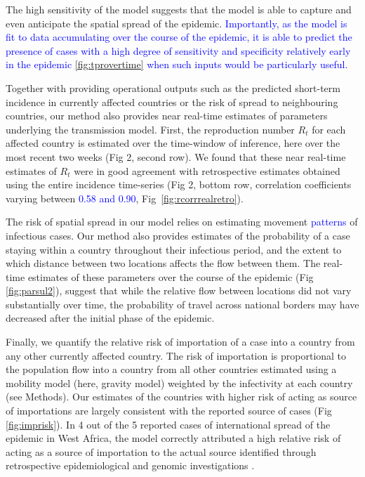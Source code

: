 \documentclass[9pt,twocolumn,twoside,lineno]{pnas-new}
\newcommand{\sangeeta}[1]{\textcolor{blue}{#1}}
\begin{document}

The high sensitivity of the model suggests that the model is able to
capture and even anticipate the spatial spread of the epidemic. 
\sangeeta{ Importantly, as the model is fit to data accumulating over
the course of the epidemic, it is able to predict the presence of
cases with a high degree of sensitivity and specificity relatively 
early in the epidemic \ref{fig:tprovertime} 
when such inputs would be particularly useful.}

Together with providing operational outputs such as the predicted
short-term incidence in currently affected countries or the risk of
spread to neighbouring countries, our method also provides near
real-time estimates of parameters underlying the transmission model.
First, the reproduction number \(R_t\) for each affected country is
estimated over the time-window of inference, here over the most recent
two weeks (Fig 2, second row). We found that these near real-time
estimates of \(R_t\) were in good agreement with retrospective estimates
obtained using the entire incidence time-series (Fig 2, bottom row,
correlation coefficients varying between \sangeeta{0.58 and 0.90}, 
Fig~\ref{fig:rcorrrealretro}).

The risk of spatial spread in our model relies on estimating movement
\sangeeta{patterns} of infectious cases. Our method also provides estimates of
the probability of a case staying within a country throughout their
infectious period, and  the extent to which
distance between two locations affects the flow between them. The
real-time estimates of these parameters over the course of the
epidemic (Fig \ref{fig:parsul2}), suggest that while the relative flow
between locations did not vary substantially over time, the probability
of travel across national borders may have decreased after the initial
phase of the epidemic.

Finally, we quantify the relative risk of importation of a case into a
country from any other currently affected country. The risk of
importation is proportional to the population flow into a country from
all other countries estimated using a mobility model (here, gravity
model) weighted by the infectivity at each country (see Methods). Our
estimates of the countries with higher risk of acting as source of
importations are largely consistent with the reported source of cases
(Fig \ref{fig:imprisk}). In 4 out of the 5 reported cases of international spread
of the epidemic in West Africa, the model correctly attributed a high relative
risk of acting as a source of importation to the actual source
identified through retrospective epidemiological and genomic
investigations \cite{gire2014genomic}.
\end{document}
